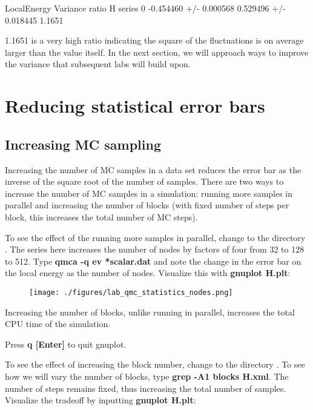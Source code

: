 \begin{shade}
                     LocalEnergy               Variance        ratio
H  series 0  -0.454460 +/- 0.000568   0.529496 +/- 0.018445   1.1651
\end{shade}

1.1651 is a very high ratio indicating the square of the fluctuations is on
average larger than the value itself.  In the next section, we will approach
ways to improve the variance that subsequent labs will build upon.  

\section{Reducing statistical error bars}

\subsection{Increasing MC sampling}

Increasing the number of MC samples in a data set reduces the error bar as the
inverse of the square root of the number of samples.  There are two ways to
increase the number of MC samples in a simulation: running more samples in
parallel and increasing the number of blocks (with fixed number of steps per
block, this increases the total number of MC steps).

To see the effect of the running more samples in parallel, change to the
directory .  The series here increases the number of nodes by
factors of four from 32 to 128 to 512.  Type \textbf{qmca -q ev *scalar.dat}
and note the change in the error bar on the local energy as the number of
nodes.  Visualize this with \textbf{gnuplot H.plt}:

\FloatBarrier
\begin{figure}[ht!]
\begin{center}
\texttt{[image: ./figures/lab\_qmc\_statistics\_nodes.png]}
\end{center}
\end{figure}
\FloatBarrier


Increasing the number of blocks, unlike running in parallel, increases the
total CPU time of the simulation.  

Press \textbf{q [Enter]} to quit gnuplot.

To see the effect of increasing the block number, change to the directory
. To see how we will vary the number of blocks, type
\textbf{grep -A1 blocks H.xml}.  The number of steps remains fixed, thus
increasing the total number of samples.   Visualize the tradeoff by inputting
\textbf{gnuplot H.plt}: 

